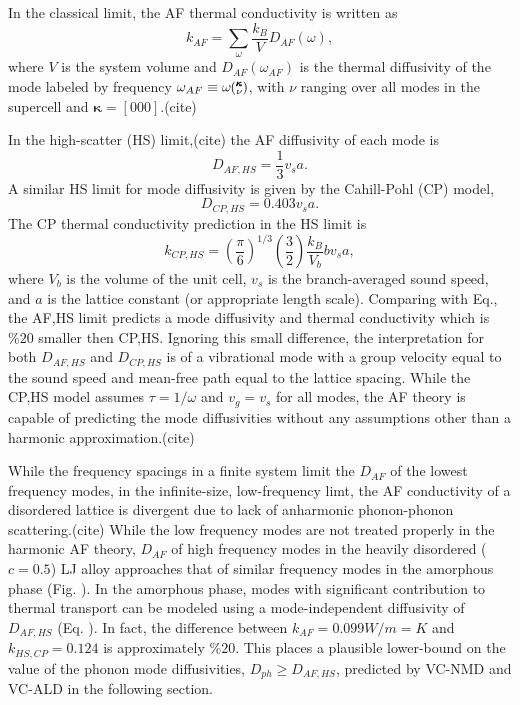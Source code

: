 \documentclass[aps,prb,twocolumn,superscriptaddress,preprintnumbers,amsmath,amssymb,floatfix]{revtex4}
\newcommand{\kv}{\mspace{-4.0mu}\left(\mspace{-8.0mu}
\begin{smallmatrix}&\pmb{\kappa} \\&\nu\end{smallmatrix}
\mspace{-3.0mu}\right)}
\begin{document}
In the classical limit, 
the AF thermal 
conductivity is written as
\begin{equation}\label{EQ:M:k_HS}
k_{AF} = \sum_\omega  \frac{k_{B}}{V} D_{AF}(\omega),
\end{equation}
where $V$ is the system volume and $D_{AF}(\omega_{AF})$ is the thermal 
diffusivity of the mode labeled by frequency 
$\omega_{AF} \equiv \omega\kv$, with 
$\nu$ ranging over all 
modes in the supercell and $\mathbf{\kappa} = [000]$.(cite) 

In the high-scatter (HS) limit,(cite) the AF diffusivity of each mode is
\begin{equation}\label{EQ:M:k_HS}
D_{AF,HS} = \frac{1}{3} v_s a.
\end{equation}
A similar HS limit for mode diffusivity 
is given by the Cahill-Pohl (CP) model, 
\begin{equation}\label{EQ:M:k_HS}
D_{CP,HS} = 0.403 v_s a.
\end{equation}
The CP thermal conductivity prediction in the HS limit is
\begin{equation}\label{EQ:M:k_HS}
k_{CP,HS} = (\frac{\pi}{6})^{1/3} (\frac{3}{2}) \frac{k_{B}}{V_b}b v_s a,
\end{equation}
where $V_b$ is the volume of the unit cell, $v_s$ is the 
branch-averaged sound speed, and $a$ is the lattice constant 
(or appropriate length scale).\cite{cahill_lattice_1988} 
Comparing with Eq., the AF,HS limit predicts a mode diffusivity and 
thermal conductivity which is $\%20$ smaller then 
CP,HS.\cite{cahill_lattice_1988} 
Ignoring this small difference, 
the interpretation for both $D_{AF,HS}$ and $D_{CP,HS}$ is of a vibrational 
mode with a group velocity equal to the sound speed 
and mean-free path equal to the 
lattice spacing. 
While the CP,HS model assumes $\tau = 1/\omega$ and $v_g = v_s$ for all 
modes, the AF theory is capable of predicting the mode diffusivities without 
any assumptions other than a harmonic approximation.(cite)

While the frequency spacings in a finite system limit 
the $D_{AF}$ of the lowest 
frequency modes, in the infinite-size,  
low-frequency limt, the AF conductivity of a disordered lattice is divergent 
due to lack of anharmonic phonon-phonon scattering.(cite)  
While the low frequency modes are not treated properly in the harmonic 
AF theory, 
$D_{AF}$ of high frequency modes in the heavily disordered ($c=0.5$) LJ 
alloy approaches that of similar frequency modes in the amorphous phase 
(Fig. ). 
In the amorphous phase, modes with significant 
contribution to thermal transport can be modeled using a mode-independent 
diffusivity of $D_{AF,HS}$ (Eq. ). In fact, the difference between  
$k_{AF} = 0.099 W/m=K$ and $k_{HS,CP} = 0.124$ is approximately 
$\%20$. 
This places a plausible lower-bound on the value of the phonon mode 
diffusivities, $D_{ph} \ge D_{AF,HS}$, predicted by VC-NMD and VC-ALD in 
the following section.
\end{document}
